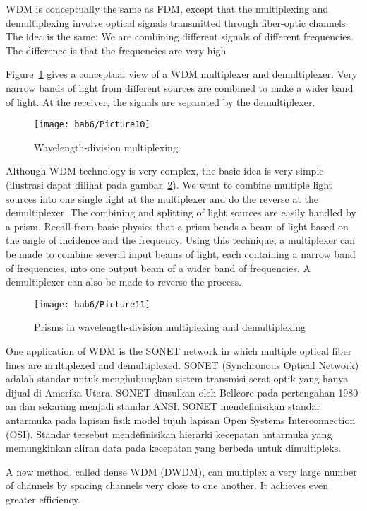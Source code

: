 WDM is conceptually the same as FDM, except that the multiplexing and demultiplexing involve optical signals transmitted through fiber-optic channels. The idea is the same: We are combining different signals of different frequencies. The difference is that the frequencies are very high

Figure~\ref{fig6:9} gives a conceptual view of a WDM multiplexer and demultiplexer. Very narrow bands of light from different sources are combined to make a wider band of light. At the receiver, the signals are separated by the demultiplexer.

\begin{figure}[htbp]
  \centering
  \texttt{[image: bab6/Picture10]}
  \caption{Wavelength-division multiplexing}
  \label{fig6:9}
\end{figure}

Although WDM technology is very complex, the basic idea is very simple (ilustrasi dapat dilihat pada gambar~\ref{fig6:10}). We want to combine multiple light sources into one single light at the multiplexer and do the reverse at the demultiplexer. The combining and splitting of light sources are easily handled by a prism. Recall from basic physics that a prism bends a beam of light based on the angle of incidence and the frequency. Using this technique, a multiplexer can be made to combine several input beams of light, each containing a narrow band of frequencies, into one output beam of a wider band of frequencies. A demultiplexer can also be made to reverse the process.

\begin{figure}[htbp]
  \centering
  \texttt{[image: bab6/Picture11]}
  \caption{Prisms in wavelength-division multiplexing and demultiplexing}
  \label{fig6:10}
\end{figure}

One application of WDM is the SONET network in which multiple optical fiber lines are multiplexed and demultiplexed. SONET (Synchronous Optical Network) adalah standar untuk menghubungkan sistem transmisi serat optik yang hanya dijual di Amerika Utara. SONET diusulkan oleh Bellcore pada pertengahan 1980-an dan sekarang menjadi standar ANSI. SONET mendefinisikan standar antarmuka pada lapisan fisik model tujuh lapisan Open Systems Interconnection (OSI). Standar tersebut mendefinisikan hierarki kecepatan antarmuka yang memungkinkan aliran data pada kecepatan yang berbeda untuk dimultipleks.

A new method, called dense WDM (DWDM), can multiplex a very large number of channels by spacing channels very close to one another. It achieves even greater efficiency.


